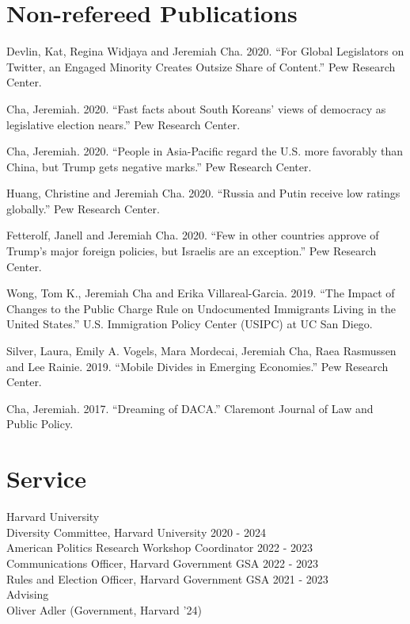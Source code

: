 \documentclass[margin, line]{res}
\begin{document}
\begin{resume}
\section{Non-refereed Publications}
\begin{etaremune}
	\item Devlin, Kat, Regina Widjaya and Jeremiah Cha. 2020. ``For Global Legislators on Twitter, an Engaged Minority Creates Outsize Share of Content.'' Pew Research Center.
	\item Cha, Jeremiah. 2020. ``Fast facts about South Koreans’ views of democracy as legislative election nears.'' Pew Research Center.
	\item Cha, Jeremiah. 2020. ``People in Asia-Pacific regard the U.S. more favorably than China, but Trump gets negative marks.'' Pew Research Center.
	\item Huang, Christine and Jeremiah Cha. 2020. ``Russia and Putin receive low ratings globally.'' Pew Research Center.
	\item Fetterolf, Janell and Jeremiah Cha. 2020. ``Few in other countries approve of Trump’s major foreign policies, but Israelis are an exception.'' Pew Research Center.
	\item Wong, Tom K., Jeremiah Cha and Erika Villareal-Garcia. 2019. ``The Impact of Changes to the Public Charge Rule on Undocumented Immigrants Living in the United States.'' U.S. Immigration Policy Center (USIPC) at UC San Diego.
	\item Silver, Laura, Emily A. Vogels, Mara Mordecai, Jeremiah Cha, Raea Rasmussen and Lee Rainie. 2019. ``Mobile Divides in Emerging Economies.'' Pew Research Center.
	\item Cha, Jeremiah. 2017. ``Dreaming of DACA.'' Claremont Journal of Law and Public Policy.
\end{etaremune}

\section{Service}
Harvard University\\
\hspace*{5mm} Diversity Committee, Harvard University \hfill 2020 - 2024\\
\hspace*{5mm} American Politics Research Workshop Coordinator \hfill 2022 - 2023\\
\hspace*{5mm} Communications Officer, Harvard Government GSA \hfill 2022 - 2023\\
\hspace*{5mm} Rules and Election Officer, Harvard Government GSA \hfill 2021 - 2023\\
\hspace*{2.5mm} Advising \\
\hspace*{5mm} Oliver Adler (Government, Harvard '24)


\end{resume}
\end{document}
